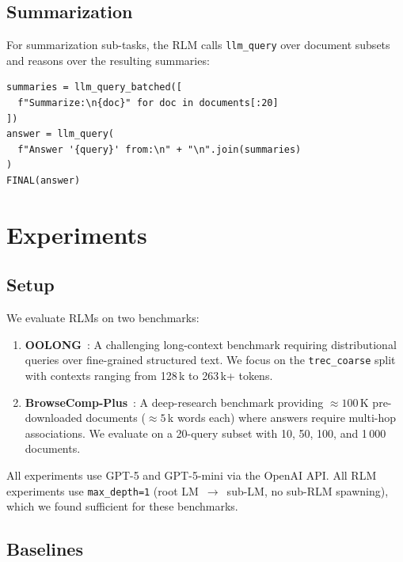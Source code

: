 \documentclass[journal, 10pt, letterpaper]{IEEEtran}
\newcommand{\code}[1]{\texttt{#1}}
\begin{document}
\subsection{Summarization}

For summarization sub-tasks, the RLM calls \code{llm\_query} over document
subsets and reasons over the resulting summaries:

\begin{lstlisting}[caption={Summarization strategy.}]
summaries = llm_query_batched([
  f"Summarize:\n{doc}" for doc in documents[:20]
])
answer = llm_query(
  f"Answer '{query}' from:\n" + "\n".join(summaries)
)
FINAL(answer)
\end{lstlisting}

\section{Experiments}
\label{sec:results}

\subsection{Setup}

We evaluate RLMs on two benchmarks:

\begin{enumerate}
  \item \textbf{OOLONG}~\cite{oolong2025}: A challenging long-context benchmark
    requiring distributional queries over fine-grained structured text.  We
    focus on the \code{trec\_coarse} split with contexts ranging from 128\,k
    to 263\,k+ tokens.
  \item \textbf{BrowseComp-Plus}~\cite{yu2025browsecompplus}: A deep-research
    benchmark providing $\approx\!100\,\text{K}$ pre-downloaded documents
    ($\approx\!5\,$k words each) where answers require multi-hop associations.
    We evaluate on a 20-query subset with 10, 50, 100, and 1\,000 documents.
\end{enumerate}

All experiments use GPT-5 and GPT-5-mini via the OpenAI API.  All RLM
experiments use \code{max\_depth=1} (root LM~$\to$~sub-LM, no sub-RLM
spawning), which we found sufficient for these benchmarks.

\subsection{Baselines}
\end{document}
